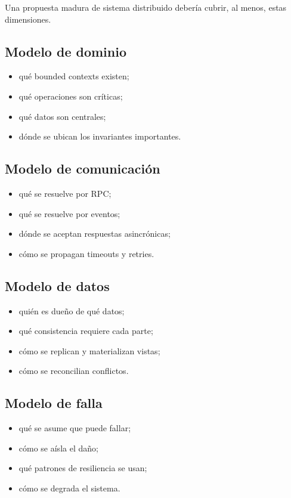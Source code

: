 \documentclass[variant=apuntes,cover=institutional,mode=screen]{ua-engineering-v6-article}
\begin{document}
Una propuesta madura de sistema distribuido debería cubrir, al menos, estas dimensiones.

\subsection{Modelo de dominio}

\begin{itemize}
\item qué bounded contexts existen;
\item qué operaciones son críticas;
\item qué datos son centrales;
\item dónde se ubican los invariantes importantes.
\end{itemize}

\subsection{Modelo de comunicación}

\begin{itemize}
\item qué se resuelve por RPC;
\item qué se resuelve por eventos;
\item dónde se aceptan respuestas asincrónicas;
\item cómo se propagan timeouts y retries.
\end{itemize}

\subsection{Modelo de datos}

\begin{itemize}
\item quién es dueño de qué datos;
\item qué consistencia requiere cada parte;
\item cómo se replican y materializan vistas;
\item cómo se reconcilian conflictos.
\end{itemize}

\subsection{Modelo de falla}

\begin{itemize}
\item qué se asume que puede fallar;
\item cómo se aísla el daño;
\item qué patrones de resiliencia se usan;
\item cómo se degrada el sistema.
\end{itemize}
\end{document}
